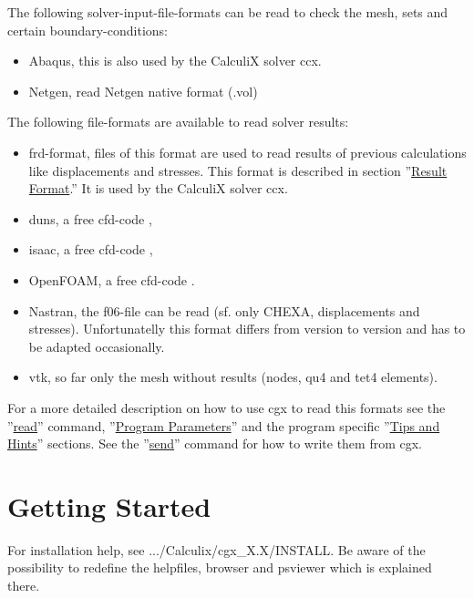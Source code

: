 \documentclass{article}
\providecommand{\htmlref}[2]{\hyperref[#2]{#1}}
\begin{document}
The following solver-input-file-formats can be read to check the mesh, sets and certain boundary-conditions:
\begin{itemize}
\item Abaqus, this is also used by the CalculiX solver ccx.
\item Netgen, read Netgen native format (.vol)
\end{itemize}
The following file-formats are available to read solver results:
\begin{itemize}
\item frd-format, files of this format are used to read results of previous calculations like displacements and stresses. This format is described in section ''\htmlref{Result Format}{Result Format}.'' It is used by the CalculiX solver ccx. 
\item duns, a free cfd-code \cite{duns},
\item isaac, a free cfd-code \cite{isaac},
\item OpenFOAM, a free cfd-code \cite{OpenFOAM}.
\item Nastran, the f06-file can be read (sf. only CHEXA, displacements and stresses). Unfortunatelly this format differs from version to version and has to be adapted occasionally.
\item vtk, so far only the mesh without results (nodes, qu4 and tet4 elements).
\end{itemize}
For a more detailed description on how to use cgx to read this formats see the ''\htmlref{read}{read}'' command, ''\htmlref{Program Parameters}{Program Parameters}'' and the program specific ''\htmlref{Tips and Hints}{Tips and Hints}'' sections.  See the ''\htmlref{send}{send}'' command for how to write them from cgx.


\section{\label{Getting Started}Getting Started}
For installation help, see .../Calculix/cgx\_X.X/INSTALL. Be aware of the possibility to redefine the helpfiles, browser and psviewer which is explained there.
\end{document}
